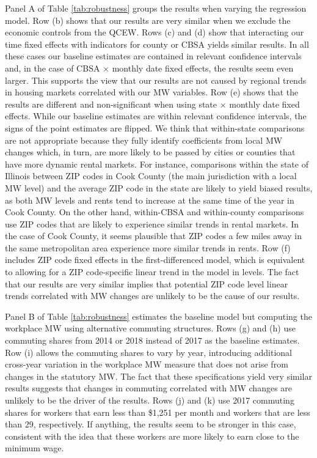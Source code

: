 Panel A of Table \ref{tab:robustness} groups the results when varying the 
regression model.
Row (b) shows that our results are very similar when we exclude the 
economic controls from the QCEW.
Rows (c) and (d) show that interacting our time fixed effects with indicators 
for county or CBSA yields similar results.
In all these cases our baseline estimates are contained in relevant 
confidence intervals and, in the case of CBSA $\times$ monthly date fixed 
effects, the results seem even larger.
This supports the view that our results are not caused by regional trends 
in housing markets correlated with our MW variables.
Row (e) shows that the results are different and non-significant when using 
state $\times$ monthly date fixed effects.
While our baseline estimates are within relevant confidence intervals, the 
signs of the point estimates are flipped.
We think that within-state comparisons are not appropriate because they fully 
identify coefficients from local MW changes which, in turn, are more likely to 
be passed by cities or counties that have more dynamic rental markets.
For instance, comparisons within the state of Illinois between ZIP codes in 
Cook County (the main jurisdiction with a local MW level) and the average
ZIP code in the state are likely to yield biased results, as both MW levels and
rents tend to increase at the same time of the year in Cook County.
On the other hand, within-CBSA and within-county comparisons use ZIP codes that
are likely to experience similar trends in rental markets.
In the case of Cook County, it seems plausible that ZIP codes a few miles away
in the same metropolitan area experience more similar trends in rents.
Row (f) includes ZIP code fixed effects in the first-differenced model, which
is equivalent to allowing for a ZIP code-specific linear trend in the model in 
levels.
The fact that our results are very similar implies that potential ZIP code 
level linear trends correlated with MW changes are unlikely to be the cause
of our results.

Panel B of Table \ref{tab:robustness} estimates the baseline model but 
computing the workplace MW using alternative commuting structures.
Rows (g) and (h) use commuting shares from 2014 or 2018 instead of 2017 as 
the baseline estimates.
Row (i) allows the commuting shares to vary by year, introducing additional
cross-year variation in the workplace MW measure that does not arise from 
changes in the statutory MW.
The fact that these specifications yield very similar results suggests that 
changes in commuting correlated with MW changes are unlikely to be the driver
of the results.
Rows (j) and (k) use 2017 commuting shares for workers that earn less than 
\$1,251 per month and workers that are less than 29, respectively.
If anything, the results seem to be stronger in this case, consistent
with the idea that these workers are more likely to earn close to the 
minimum wage.

